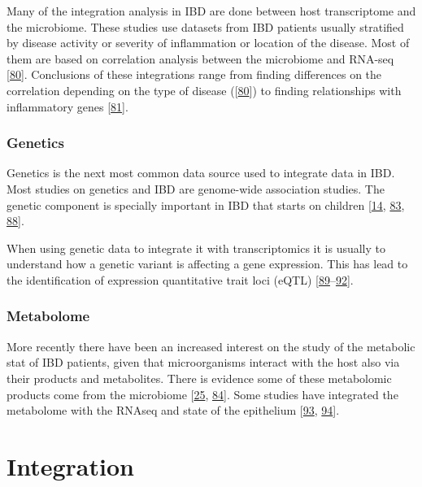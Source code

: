 \documentclass[
  12pt,
  a4paper,
  twoside,
  openright]{book}
\begin{document}
Many of the integration analysis in IBD are done between host transcriptome and the microbiome.
These studies use datasets from IBD patients usually stratified by disease activity or severity of inflammation or location of the disease.
Most of them are based on correlation analysis between the microbiome and RNA-seq {[}\protect\hyperlink{ref-hasler_uncoupling_2016}{80}{]}.
Conclusions of these integrations range from finding differences on the correlation depending on the type of disease ({[}\protect\hyperlink{ref-hasler_uncoupling_2016}{80}{]}) to finding relationships with inflammatory genes {[}\protect\hyperlink{ref-tang2017}{81}{]}.

\hypertarget{genetics-1}{%
\subsubsection{Genetics}\label{genetics-1}}

Genetics is the next most common data source used to integrate data in IBD.
Most studies on genetics and IBD are genome-wide association studies.
The genetic component is specially important in IBD that starts on children {[}\protect\hyperlink{ref-kumar2019}{14}, \protect\hyperlink{ref-huWholeExomeSequencing2021}{83}, \protect\hyperlink{ref-knights2013}{88}{]}.

When using genetic data to integrate it with transcriptomics it is usually to understand how a genetic variant is affecting a gene expression.
This has lead to the identification of expression quantitative trait loci (eQTL) {[}\protect\hyperlink{ref-repnik2016}{89}--\protect\hyperlink{ref-dai2019}{92}{]}.

\hypertarget{metabolome}{%
\subsubsection{Metabolome}\label{metabolome}}

More recently there have been an increased interest on the study of the metabolic stat of IBD patients, given that microorganisms interact with the host also via their products and metabolites.
There is evidence some of these metabolomic products come from the microbiome {[}\protect\hyperlink{ref-ferrer-picuxf3n2020}{25}, \protect\hyperlink{ref-mayorgas2021}{84}{]}.
Some studies have integrated the metabolome with the RNAseq and state of the epithelium {[}\protect\hyperlink{ref-ahmed2016}{93}, \protect\hyperlink{ref-gallagher2021}{94}{]}.

\hypertarget{integration}{%
\section{Integration}\label{integration}}
\end{document}
